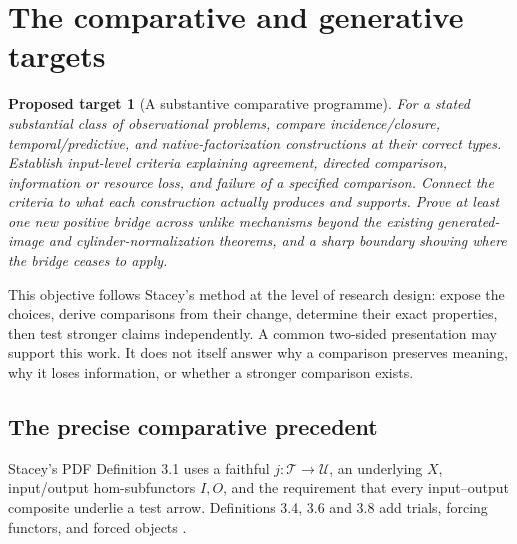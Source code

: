 \documentclass[11pt]{article}
\newtheorem{target}[definition]{Proposed target}
\theoremstyle{remark}
\begin{document}
\section{The comparative and generative targets}
\label{sec:central}

\begin{target}[A substantive comparative programme]
\label{target:central}
For a stated substantial class of observational problems, compare incidence/closure, temporal/predictive, and native-factorization constructions at their correct types. Establish input-level criteria explaining agreement, directed comparison, information or resource loss, and failure of a specified comparison. Connect the criteria to what each construction actually produces and supports. Prove at least one new positive bridge across unlike mechanisms beyond the existing generated-image and cylinder-normalization theorems, and a sharp boundary showing where the bridge ceases to apply.
\end{target}

This objective follows Stacey's method at the level of research design: expose the choices, derive comparisons from their change, determine their exact properties, then test stronger claims independently. A common two-sided presentation may support this work. It does not itself answer why a comparison preserves meaning, why it loses information, or whether a stronger comparison exists.

\subsection{The precise comparative precedent}
\label{sec:stacey}

Stacey's PDF Definition 3.1 uses a faithful $j:\mathcal T\to\mathcal U$, an underlying $X$, input/output hom-subfunctors $I,O$, and the requirement that every input--output composite underlie a test arrow. Definitions 3.4, 3.6 and 3.8 add trials, forcing functors, and forced objects \cite{Stacey}.
\end{document}
